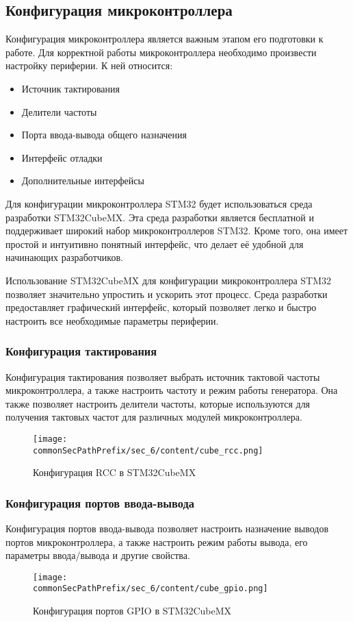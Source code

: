 \subsection{Конфигурация микроконтроллера}
Конфигурация микроконтроллера является важным этапом его подготовки к работе. Для корректной работы микроконтроллера необходимо произвести настройку периферии. К ней относится:
\begin{itemize}
    \item Источник тактирования
    \item Делители частоты
    \item Порта ввода-вывода общего назначения
    \item Интерфейс отладки
    \item Дополнительные интерфейсы
\end{itemize}
Для конфигурации микроконтроллера STM32 будет использоваться среда разработки STM32CubeMX. Эта среда разработки является бесплатной и поддерживает широкий набор микроконтроллеров STM32. Кроме того, она имеет простой и интуитивно понятный интерфейс, что делает её удобной для начинающих разработчиков.

Использование STM32CubeMX для конфигурации микроконтроллера STM32 позволяет значительно упростить и ускорить этот процесс. Среда разработки предоставляет графический интерфейс, который позволяет легко и быстро настроить все необходимые параметры периферии.

\subsubsection{Конфигурация тактирования}
Конфигурация тактирования позволяет выбрать источник тактовой частоты микроконтроллера, а также настроить частоту и режим работы генератора. Она также позволяет настроить делители частоты, которые используются для получения тактовых частот для различных модулей микроконтроллера.
\begin{figure}[ht]
    \centering
    \texttt{[image: \\commonSecPathPrefix/sec\_6/content/cube\_rcc.png]}
    \caption{Конфигурация RCC в STM32CubeMX}
\end{figure}

\subsubsection{Конфигурация портов ввода-вывода}
Конфигурация портов ввода-вывода позволяет настроить назначение выводов портов микроконтроллера, а также настроить режим работы вывода, его параметры ввода/вывода и другие свойства.
\begin{figure}[ht]
    \centering
    \texttt{[image: \\commonSecPathPrefix/sec\_6/content/cube\_gpio.png]}
    \caption{Конфигурация портов GPIO в STM32CubeMX}
\end{figure}

